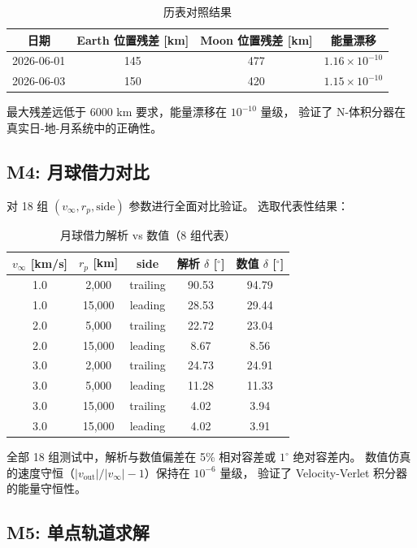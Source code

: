 \documentclass[12pt,a4paper]{ctexart}
\begin{document}
\begin{table}[H]
\centering
\caption{历表对照结果}
\begin{tabular}{cccc}
\toprule
日期 & Earth 位置残差 [km] & Moon 位置残差 [km] & 能量漂移 \\
\midrule
2026-06-01 & 145 & 477 & $1.16\times10^{-10}$ \\
2026-06-03 & 150 & 420 & $1.15\times10^{-10}$ \\
\bottomrule
\end{tabular}
\end{table}

最大残差远低于 6000 km 要求，能量漂移在 $10^{-10}$ 量级，
验证了 N-体积分器在真实日-地-月系统中的正确性。

\subsection{M4: 月球借力对比}

对 18 组 $(v_\infty, r_p, \text{side})$ 参数进行全面对比验证。
选取代表性结果：

\begin{table}[H]
\centering
\caption{月球借力解析 vs 数值（8 组代表）}
\begin{tabular}{ccccc}
\toprule
$v_\infty$ [km/s] & $r_p$ [km] & side & 解析 $\delta$ [$^\circ$] & 数值 $\delta$ [$^\circ$] \\
\midrule
1.0 & 2,000 & trailing & 90.53 & 94.79 \\
1.0 & 15,000 & leading & 28.53 & 29.44 \\
2.0 & 5,000 & trailing & 22.72 & 23.04 \\
2.0 & 15,000 & leading & 8.67 & 8.56 \\
3.0 & 2,000 & trailing & 24.73 & 24.91 \\
3.0 & 5,000 & leading & 11.28 & 11.33 \\
3.0 & 15,000 & trailing & 4.02 & 3.94 \\
3.0 & 15,000 & leading & 4.02 & 3.91 \\
\bottomrule
\end{tabular}
\end{table}

全部 18 组测试中，解析与数值偏差在 5\% 相对容差或 $1^\circ$ 绝对容差内。
数值仿真的速度守恒（$|v_{\text{out}}|/|v_\infty| - 1$）保持在 $10^{-6}$ 量级，
验证了 Velocity-Verlet 积分器的能量守恒性。

\subsection{M5: 单点轨道求解}
\end{document}
